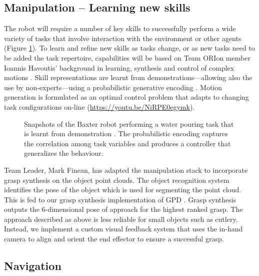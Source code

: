 \documentclass[runningheads,a4paper]{llncs}
\newcommand{\teamori}{Team ORIon}
\begin{document}
\subsection{Manipulation -- Learning new skills}

The robot will require a number of key skills to successfully perform a wide
variety of tasks that involve interaction with the environment or other
agents (Figure \ref{fig:baxter_water_task}). To learn and refine new skills as tasks change, or as new tasks need to be added the task repertoire, capabilities will be based on \teamori{} member Ioannis Havoutis' background in learning, synthesis and control of 
complex motions \cite{Havoutis16SSRR}. Skill representations
are learnt from demonstrations---allowing also the use by non-experts---using a probabilistic generative encoding \cite{Havoutis17ICRA}. Motion generation is formulated as an optimal control problem that adapts to changing task configurations on-line \cite{Zeestraten17IROS,Zeestraten2017-RAL} (\url{https://youtu.be/NiRPE0egymk}).
\begin{figure}[!t]
	\centering
	\vspace{-10pt}%
	\caption{Snapshots of the Baxter robot performing a water pouring task that
	is learnt from demonstration \cite{Zeestraten2017-RAL}. The probabilistic
	encoding captures the correlation among task variables and produces a
	controller that generalizes the behaviour.}
	\label{fig:baxter_water_task}
	\vspace{-3ex}
\end{figure}
Team Leader, Mark Finean, has adapted the manipulation stack to incorporate grasp synthesis on the object point clouds. The object recognition system identifies the pose of the object which is used for segmenting the point cloud. This is fed to our grasp synthesis implementation of GPD \cite{GPD1} \cite{GPD2}. Grasp synthesis outputs the 6-dimensional pose of approach for the highest ranked grasp. The approach described as above is less reliable for small objects such as cutlery. Instead, we implement a custom visual feedback system that uses the in-hand camera to align and orient the end effector to ensure a successful grasp.  

\subsection{Navigation}\label{nav}
\end{document}
